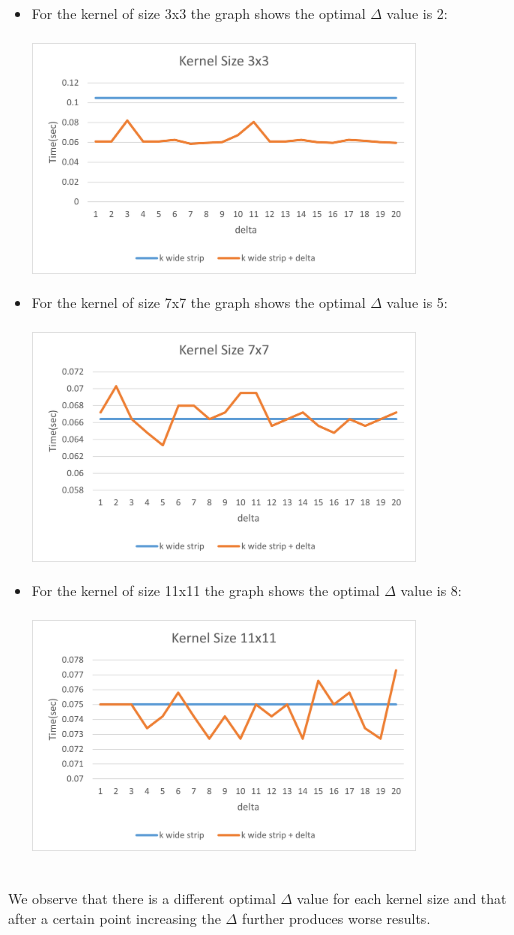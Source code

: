 \documentclass{article}
\begin{document}
\begin{enumerate} [label = \Alph*]
  \begin{itemize}
    \item For the kernel of size 3x3 the graph shows the optimal $\Delta$ value is 2: \\ \\
    \includegraphics[width=0.8\textwidth]{Problem15_3.png} \newpage
    \item For the kernel of size 7x7 the graph shows the optimal $\Delta$ value is 5: \\ \\
    \includegraphics[width=0.8\textwidth]{Problem15_7.png}\newline \\
    \item For the kernel of size 11x11 the graph shows the optimal $\Delta$ value is 8: \\ \\
    \includegraphics[width=0.8\textwidth]{Problem15_11.png}
  \end{itemize}
  \noindent \\ We observe that there is a different optimal $\Delta$ value for each kernel size and that after a certain point 
  increasing the $\Delta$ further produces worse results.
  
\end{enumerate}
\end{document}
